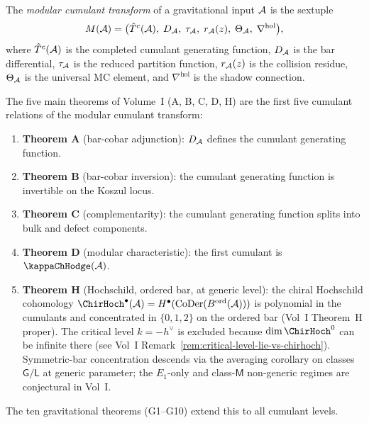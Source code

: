 \begin{definition}
The \emph{modular cumulant transform} of a gravitational input $\mathcal{A}$ is
the sextuple
\begin{equation}%
M(\cA) = \bigl(
\hat{T}^c(\cA),\;
D_\cA,\;
\tau_\cA,\;
r_\cA(z),\;
\Theta_\cA,\;
\nabla^{\mathrm{hol}}
\bigr),
\end{equation}
where $\hat{T}^c(\mathcal{A})$ is the completed cumulant generating function,
$D_{\mathcal{A}}$ is the bar differential, $\tau_{\mathcal{A}}$ is the reduced partition
function, $r_{\mathcal{A}}(z)$ is the collision residue, $\Theta_{\mathcal{A}}$ is the
universal MC element, and $\nabla^{\mathrm{hol}}$ is the shadow
connection.
\end{definition}

\begin{remark}
The five main theorems of Volume~I (A, B, C, D, H) are the first
five cumulant relations of the modular cumulant transform:
\begin{enumerate}[label=\textup{(\roman*)}]
\item \textbf{Theorem A} (bar-cobar adjunction): $D_{\mathcal{A}}$ defines
 the cumulant generating function.
\item \textbf{Theorem B} (bar-cobar inversion): the cumulant
 generating function is invertible on the Koszul locus.
\item \textbf{Theorem C} (complementarity): the cumulant
 generating function splits into bulk and defect components.
\item \textbf{Theorem D} (modular characteristic): the first
 cumulant is $\kappaChHodge(\cA)$.
\item \textbf{Theorem H} (Hochschild, ordered bar, at generic level): the chiral
 Hochschild cohomology $\ChirHoch^\bullet(\cA)=H^\bullet(\mathrm{CoDer}(B^{\mathrm{ord}}(\cA)))$
 is polynomial in the cumulants and concentrated in $\{0,1,2\}$ on the ordered
 bar (Vol~I Theorem~H proper). The critical level $k = -h^\vee$ is excluded
 because $\dim \ChirHoch^0$ can be infinite there (see Vol~I
 Remark~\ref*{rem:critical-level-lie-vs-chirhoch}). Symmetric-bar concentration
 descends via the averaging corollary on classes $\mathsf{G}/\mathsf{L}$ at
 generic parameter; the $E_1$-only and class-$\mathsf{M}$ non-generic regimes
 are conjectural in Vol~I.
\end{enumerate}
The ten gravitational theorems (G1--G10) extend this to all cumulant
levels.
\end{remark}


